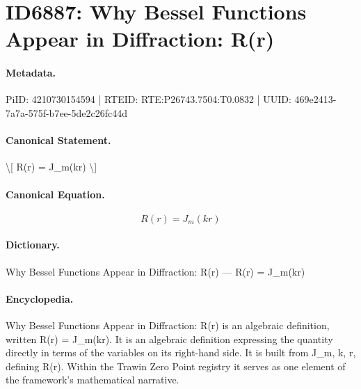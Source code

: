 \section*{ID6887: Why Bessel Functions Appear in Diffraction: R(r)}
\paragraph{Metadata.}
PiID: 4210730154594 | RTEID: RTE:P26743.7504:T0.0832 | UUID: 469e2413-7a7a-575f-b7ee-5de2c26fc44d

\paragraph{Canonical Statement.}
\textbackslash{}[ R(r) = J\_m(kr) \textbackslash{}]

\paragraph{Canonical Equation.}
\[
R(r) = J_m(kr)
\]

\paragraph{Dictionary.}
Why Bessel Functions Appear in Diffraction: R(r) — R(r) = J\_m(kr)

\paragraph{Encyclopedia.}
Why Bessel Functions Appear in Diffraction: R(r) is an algebraic definition, written R(r) = J\_m(kr). It is an algebraic definition expressing the quantity directly in terms of the variables on its right-hand side. It is built from J\_m, k, r, defining R(r). Within the Trawin Zero Point registry it serves as one element of the framework's mathematical narrative.
